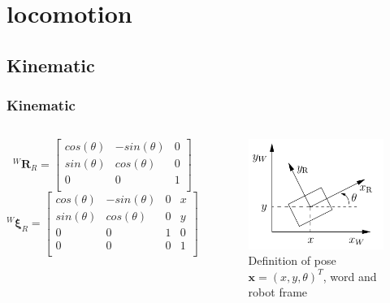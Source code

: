 \documentclass{beamer}
\begin{document}
\section{locomotion}
\subsection{Kinematic}
\begin{frame}
\frametitle{Kinematic}
\begin{columns}
  \begin{equation}
  ^W\mathbf{R}_R =
    \begin{bmatrix}
      cos(\theta) & -sin(\theta) & 0 \\
      sin(\theta) &  cos(\theta) & 0 \\
      0 &  0 & 1 \\
    \end{bmatrix}
  \end{equation}
  \begin{equation}
    ^W\mathbf{\xi}_R =
      \begin{bmatrix}
        cos(\theta) & -sin(\theta) & 0 & x\\
        sin(\theta) &  cos(\theta) & 0 & y\\
        0 & 0 & 1 & 0 \\
        0 & 0 & 0 & 1 \\
      \end{bmatrix}
  \end{equation}

  \begin{figure}
    \includegraphics[width = \textwidth]{fig/pose.png}
    \caption{Definition of pose $\textbf{x} = (x, y, \theta)^T$, word and robot frame \cite{Roehrig2017@motion}}
  \end{figure}
  \end{columns}
\end{frame}
\end{document}
